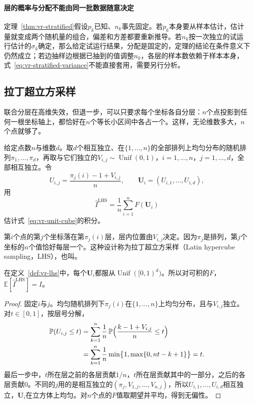 \paragraph{层的概率与分配不能由同一批数据随意决定}
定理~\ref{thm:vr-stratified}假设$p_k$已知、$n_k$事先固定。若$p_k$本身要从样本估计，估计量就变成两个随机量的组合，偏差和方差都要重新推导。若$n_k$按一次独立的试运行估计的$\sigma_k$确定，那么给定试运行结果，分配是固定的，定理的结论在条件意义下仍然成立；若边抽样边根据已抽到的值调整$n_k$，各层的样本数依赖于样本本身，式~\eqref{eq:vr-stratified-variance}不能直接套用，需要另行分析。

\subsection{拉丁超立方采样}
\label{sec:vr-lhs}

联合分层在高维失效，但退一步，可以只要求每个坐标各自分层：$n$个点投影到任何一根坐标轴上，都恰好在$n$个等长小区间中各占一个。这样，无论维数多大，$n$个点就够了。

\begin{definition}[拉丁超立方设计]
\label{def:vr-lhs}
给定点数$n$与维数$d$。取$d$个相互独立、在$\{1,\dots,n\}$的全部排列上均匀分布的随机排列$\pi_1,\dots,\pi_d$，再取与它们独立的$V_{i,j}\sim\operatorname{Unif}(0,1)$，$i=1,\dots,n$，$j=1,\dots,d$，全部相互独立。令
\begin{equation}
 U_{i,j}=\frac{\pi_j(i)-1+V_{i,j}}{n},\qquad \bm{U}_i=(U_{i,1},\dots,U_{i,d}) ,
 \label{eq:vr-lhs}
\end{equation}
用
\begin{equation}
 \hat{I}^{\mathrm{LHS}}=\frac1n\sum_{i=1}^{n}F(\bm{U}_i)
 \label{eq:vr-lhs-estimator}
\end{equation}
估计式~\eqref{eq:vr-unit-cube}的积分。
\end{definition}

第$i$个点的第$j$个坐标落在第$\pi_j(i)$层，层内位置由$V_{i,j}$决定。因为$\pi_j$是排列，第$j$个坐标的$n$个值恰好每层一个。这种设计称为拉丁超立方采样（Latin hypercube sampling，LHS），也叫。

\begin{theorem}[拉丁超立方的无偏性]
\label{thm:vr-lhs-unbiased}
在定义~\ref{def:vr-lhs}中，每个$\bm{U}_i$都服从$\operatorname{Unif}([0,1)^d)$。所以对可积的$F$，$\mathbb{E}[\hat{I}^{\mathrm{LHS}}]=I$。
\end{theorem}

\begin{proof}
固定$i$与$j$。均匀随机排列下$\pi_j(i)$在$\{1,\dots,n\}$上均匀分布，且与$V_{i,j}$独立。对$t\in[0,1]$，按层号分解，
\[
 \begin{aligned}
 \mathbb{P}(U_{i,j}\leq t)&=\sum_{k=1}^{n}\frac1n\,\mathbb{P}\Bigl(\frac{k-1+V_{i,j}}{n}\leq t\Bigr)\\
 &=\sum_{k=1}^{n}\frac1n\min\bigl\{1,\max\{0,nt-k+1\}\bigr\}=t .
 \end{aligned}
\]
最后一步中，$t$所在层之前的各层贡献$1/n$，$t$所在层贡献其中的一部分，之后的各层贡献$0$。不同的$j$用的是相互独立的$(\pi_j,V_{1,j},\dots,V_{n,j})$，所以$U_{i,1},\dots,U_{i,d}$相互独立，$\bm{U}_i$在立方体上均匀。对$n$个点的$F$值取期望并平均，得到无偏性。
\end{proof}

